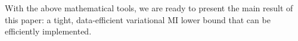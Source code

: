 \documentclass{article}
\theoremstyle{plain}
\theoremstyle{definition}
\theoremstyle{remark}
\newcommand{\infonce}{\texttt{InfoNCE}}
\newcommand{\FLO}{\texttt{FLO}}
\begin{document}
		
		With the above mathematical tools, we are ready to present the main result of this paper: a tight, data-efficient variational MI lower bound that can be efficiently implemented. 
		
		
		
\end{document}

